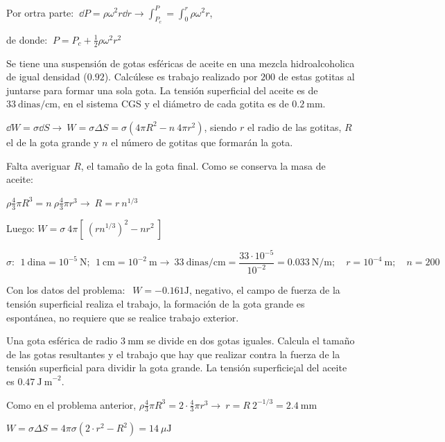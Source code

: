 Por ortra parte: $\ \displaystyle \dd P = \rho \omega^2 r \dd r \to \int_{P_c}^P=\int_{0}^r \rho \omega^2 r$, 

de donde: $\ P=P_c+\frac 1 2 \rho \omega^2 r^2$ 

\begin{prob}
Se tiene una suspensión de gotas esféricas de aceite en una mezcla hidroalcoholica de igual densidad ($0.92$). Calcúlese es trabajo realizado por $200$ de estas gotitas al juntarse para formar una sola gota. La tensión superficial del aceite es de $33 \ \mathrm{dinas/cm}$, en el sistema CGS y el diámetro de cada gotita es de $0.2\ \mathrm{mm}$.
\end{prob}

$\dd W = \sigma \dd S \to \ W=\sigma \Delta S=\sigma (4\pi R^2 -n\  4\pi r^2)$, siendo $r$ el radio de las gotitas, $R$ el de la gota grande y $n$ el número de gotitas que formarán la gota.

Falta averiguar $R$, el tamaño de la gota final. Como se conserva la masa de aceite:

$\rho \frac 4 3 \pi R^3= n\ \rho \frac 4 3 \pi r^3 \to \ R=r\ n^{1/3}$

Luego: $W=\sigma \ 4\pi [\ (rn^{1/3})^2-nr^2 \ ]$

$\sigma:\ \ 1 \ \mathrm{dina}=10^{-5}\ \mathrm{N};\ \ 1\ \mathrm{cm} = 10^{-2}\ \mathrm{m} \to \ 33 \ \mathrm{dinas/cm} = \dfrac {33\cdot 10^{-5}}{10^{-2}}=0.033 \ \mathrm{N/m}; \quad r=10^{-4} \ \mathrm{m}; \quad n=200$

Con los datos del problema: $\ \ W=-0.161 \mathrm{J}$, negativo, el campo de fuerza de la tensión superficial realiza el trabajo, la formación de la gota grande es espontánea, no requiere que se realice trabajo exterior.

\begin{prob}
Una gota esférica de radio $3\ \mathrm{mm}$ se divide en dos gotas iguales. Calcula el tamaño de las gotas resultantes y el trabajo que hay que realizar contra la fuerza de la tensión superficial	para dividir la gota grande. La tensión superficie¡al del aceite es $0.47\ \mathrm{J\ m}^{-2}$.
\end{prob}

Como en el problema anterior, $\rho \frac 4 3 \pi R^3 = 2\cdot \frac 4 3 \pi r^3 \to \ r=R\ 2^{-1/3}=2.4\ \mathrm{mm}$

$W=\sigma \Delta S = 4 \pi \sigma (2\cdot r^2-R^2)=14\ \mu \mathrm{J}$



